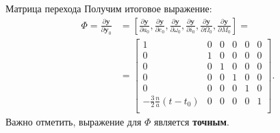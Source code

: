 \documentclass[8pt]{beamer}
\begin{document}
\begin{frame}{Матрица перехода}
Получим итоговое выражение:
\begin{align*}
    \Phi = \frac{\partial \mathbf{y}}{\partial \mathbf{y}_0} &= 
    \left[ \frac{\partial \mathbf{y}}{\partial a_0},
    \frac{\partial \mathbf{y}}{\partial e_0},
    \frac{\partial \mathbf{y}}{\partial \omega_0},
    \frac{\partial \mathbf{y}}{\partial i_0}, 
    \frac{\partial \mathbf{y}}{\partial \Omega_0}, 
    \frac{\partial \mathbf{y}}{\partial M_0}\right] = \\
    &=
    \begin{bmatrix}
        1 & 0 & 0 & 0 & 0 & 0 \\
        0 & 1 & 0 & 0 & 0 & 0 \\
        0 & 0 & 1 & 0 & 0 & 0 \\
        0 & 0 & 0 & 1 & 0 & 0 \\
        0 & 0 & 0 & 0 & 1 & 0 \\
        -\frac{3}{2} \frac{n}{a} (t - t_0) & 0 & 0 & 0 & 0 & 1 \\
    \end{bmatrix}.
\end{align*}
Важно отметить, выражение для $\Phi$ является \textbf{точным}.
\end{frame}
\end{document}
